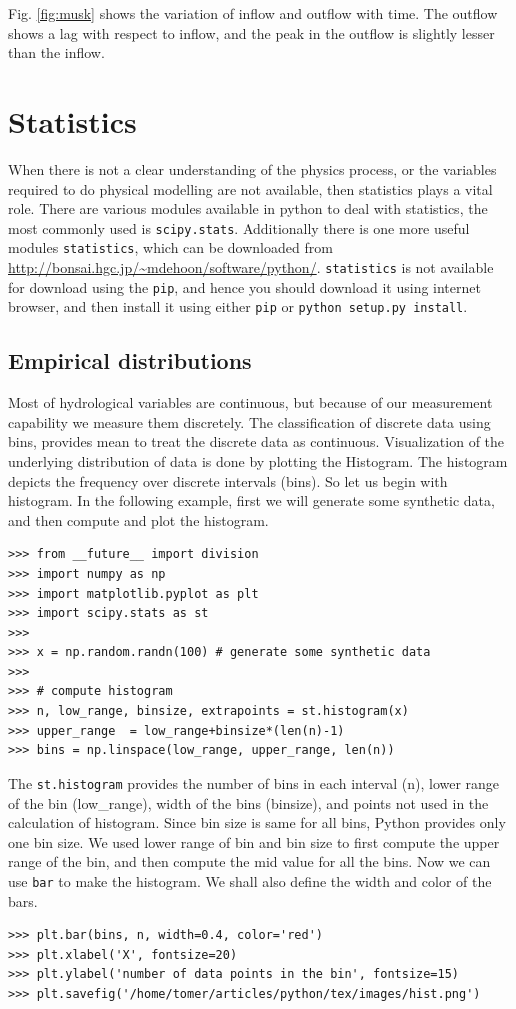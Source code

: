 \documentclass[10pt]{book}
\begin{document}
{Fig. \ref{fig:musk} shows the variation of inflow and outflow with time. The outflow shows a lag with respect to inflow, and the peak in the outflow is slightly lesser than the inflow.

\chapter{Statistics}
When there is not a clear understanding of the physics process, or the variables required to do physical modelling are not available, then statistics plays a vital role. There are various modules available in python to deal with statistics, the most commonly used is \verb"scipy.stats". Additionally there is one more useful modules \verb"statistics", which can be downloaded from \url{http://bonsai.hgc.jp/~mdehoon/software/python/}. \verb"statistics" is not available for download using the \verb"pip", and hence you should download it using internet browser, and then install it using either \verb"pip" or \verb"python setup.py install". 

\section{Empirical distributions}
Most of hydrological variables are continuous, but because of our measurement capability we measure them discretely. The classification of discrete data using bins, provides mean to treat the discrete data as continuous. Visualization of the underlying distribution of data is done by plotting the Histogram.  The histogram depicts the frequency over discrete intervals (bins). So let us begin with histogram. In the following example, first we will generate some synthetic data, and then compute and plot the histogram. 

\beforeverb \begin{verbatim}
>>> from __future__ import division
>>> import numpy as np
>>> import matplotlib.pyplot as plt
>>> import scipy.stats as st
>>> 
>>> x = np.random.randn(100) # generate some synthetic data
>>> 
>>> # compute histogram
>>> n, low_range, binsize, extrapoints = st.histogram(x)
>>> upper_range  = low_range+binsize*(len(n)-1)
>>> bins = np.linspace(low_range, upper_range, len(n))
\end{verbatim} \afterverb
The \verb"st.histogram" provides the number of bins in each interval (n), lower range of the bin (low\_range), width of the bins (binsize), and points not used in the calculation of histogram. Since bin size is same for all bins, Python provides only one bin size. We used lower range of bin and bin size to first compute the upper range of the bin, and then compute the mid value for all the bins. Now we can use \verb"bar" to make the histogram. We shall also define the width and color of the bars. 
\beforeverb \begin{verbatim}
>>> plt.bar(bins, n, width=0.4, color='red')
>>> plt.xlabel('X', fontsize=20)
>>> plt.ylabel('number of data points in the bin', fontsize=15)
>>> plt.savefig('/home/tomer/articles/python/tex/images/hist.png')
\end{verbatim} \afterverb

}
\end{document}

